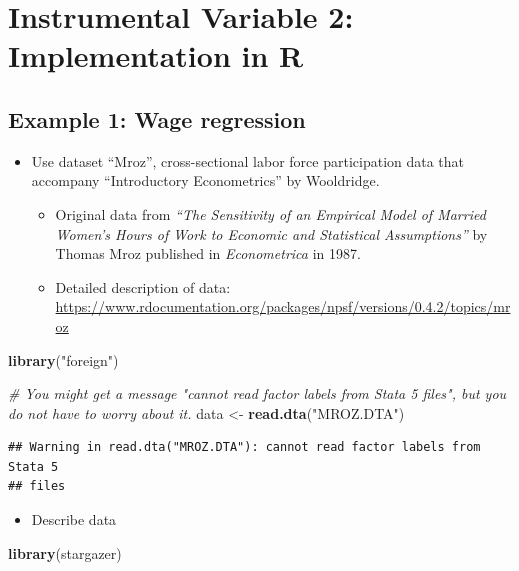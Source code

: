 \documentclass[]{book}
\newenvironment{Shaded}{\begin{snugshade}}{\end{snugshade}}
\newcommand{\KeywordTok}[1]{\textcolor[rgb]{0.13,0.29,0.53}{\textbf{#1}}}
\newcommand{\StringTok}[1]{\textcolor[rgb]{0.31,0.60,0.02}{#1}}
\newcommand{\CommentTok}[1]{\textcolor[rgb]{0.56,0.35,0.01}{\textit{#1}}}
\newcommand{\NormalTok}[1]{#1}
\providecommand{\tightlist}{%
  \setlength{\itemsep}{0pt}\setlength{\parskip}{0pt}}
\begin{document}
\chapter{Instrumental Variable 2: Implementation in
R}\label{instrumental-variable-2-implementation-in-r}

\section{Example 1: Wage regression}\label{example-1-wage-regression}

\begin{itemize}
\tightlist
\item
  Use dataset ``Mroz'', cross-sectional labor force participation data
  that accompany ``Introductory Econometrics'' by Wooldridge.

  \begin{itemize}
  \tightlist
  \item
    Original data from \emph{``The Sensitivity of an Empirical Model of
    Married Women's Hours of Work to Economic and Statistical
    Assumptions''} by Thomas Mroz published in \emph{Econometrica} in
    1987.
  \item
    Detailed description of data:
    \url{https://www.rdocumentation.org/packages/npsf/versions/0.4.2/topics/mroz}
  \end{itemize}
\end{itemize}

\begin{Shaded}
\begin{Highlighting}[]
\KeywordTok{library}\NormalTok{(}\StringTok{"foreign"}\NormalTok{)}

\CommentTok{# You might get a message "cannot read factor labels from Stata 5 files", but you do not have to worry about it. }
\NormalTok{data <-}\StringTok{ }\KeywordTok{read.dta}\NormalTok{(}\StringTok{"MROZ.DTA"}\NormalTok{)}
\end{Highlighting}
\end{Shaded}

\begin{verbatim}
## Warning in read.dta("MROZ.DTA"): cannot read factor labels from Stata 5
## files
\end{verbatim}

\begin{itemize}
\tightlist
\item
  Describe data
\end{itemize}

\begin{Shaded}
\begin{Highlighting}[]
\KeywordTok{library}\NormalTok{(stargazer)}
\end{Highlighting}
\end{Shaded}
\end{document}
